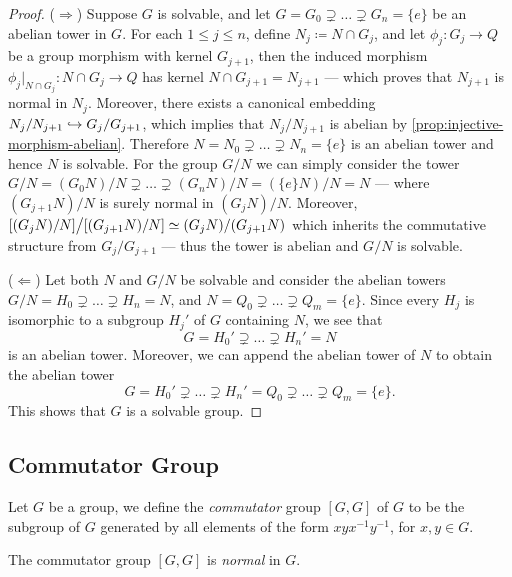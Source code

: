 \begin{proof}
(\(\Rightarrow\)) Suppose \(G\) is solvable, and let \(G = G_0 \supsetneq \dots
\supsetneq G_n = \{e\}\) be an abelian tower in \(G\).  For each \(1 \leq j \leq
n\), define \(N_{j} \coloneq N \cap G_j\), and let \(\phi_j: G_j \to Q\) be a
group morphism with kernel \(G_{j+1}\), then the induced morphism \(\phi_j|_{N
\cap G_j}: N \cap G_j \to Q\) has kernel \(N \cap G_{j+1} = N_{j+1}\) --- which
proves that \(N_{j+1}\) is normal in \(N_j\). Moreover, there exists a canonical
embedding \(N_j/N_{j+1} \hookrightarrow G_j/G_{j+1}\), which implies that \(N_j/N_{j+1}\)
is abelian by \cref{prop:injective-morphism-abelian}. Therefore \(N = N_0
\supsetneq \dots \supsetneq N_n = \{e\}\) is an abelian tower and hence \(N\) is
solvable. For the group \(G/N\) we can simply consider the tower \(G/N = (G_0
N)/N \supsetneq \dots \supsetneq (G_n N)/N = (\{e\} N)/N = N\) --- where
\((G_{j+1} N)/N\) is surely normal in \((G_j N)/N\). Moreover, \([(G_j N)/N]
\big/ [(G_{j+1} N)/N] \simeq (G_j N)/(G_{j+1} N)\) which inherits the commutative
structure from \(G_j/G_{j+1}\) --- thus the tower is abelian and \(G/N\) is
solvable.

(\(\Leftarrow\)) Let both \(N\) and \(G/N\) be solvable and consider the abelian
towers \(G/N = H_0 \supsetneq \dots \supsetneq H_n = N\), and \(N = Q_0
\supsetneq \dots \supsetneq Q_m = \{e\}\). Since every \(H_j\) is isomorphic to
a subgroup \(H_j'\) of \(G\) containing \(N\), we see that
\[
  G = H_0' \supsetneq \dots \supsetneq H_n' = N
\]
is an abelian tower. Moreover, we can append the abelian tower of \(N\) to
obtain the abelian tower
\[
G = H_0' \supsetneq \dots \supsetneq H_n'
= Q_0 \supsetneq \dots \supsetneq Q_m = \{e\}.
\]
This shows that \(G\) is a solvable group.
\end{proof}

\subsection{Commutator Group}

\begin{definition}
\label{def:commutator-group}
Let \(G\) be a group, we define the \emph{commutator} group \([G, G]\) of \(G\)
to be the subgroup of \(G\) generated by all elements of the form \(x y x^{-1}
y^{-1}\), for \(x, y \in G\).
\end{definition}

\begin{lemma}
\label{lem:commutator-is-normal}
The commutator group \([G, G]\) is \emph{normal} in \(G\).
\end{lemma}

